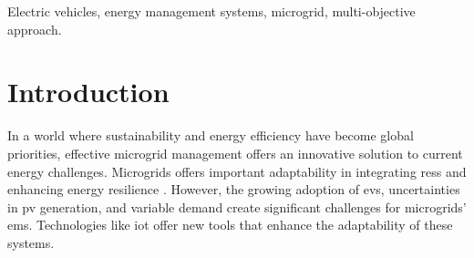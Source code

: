 \documentclass[preprint, 12pt, 3p]{elsarticle}
\begin{document}
\begin{frontmatter}
    \begin{abstract}
        The integration of \glspl{der}, \glspl{bess}, \gls{pv} systems, 
        and \gls{ev} chargers, introduces new challenges for \gls{ems} in
        microgrids.
        One key challenge is developing an optimized day-ahead EMS specifically 
        tailored for three-phase unbalanced AC microgrids, while also 
        accounting for uncertainties in PV generation and demand. 
        Additionally, the EMS must prepare the microgrid for potential 
        transitions between grid-connected and islanded modes due to 
        unexpected grid outages.
        This study addresses a \gls{moop} approach aimed at minimizing 
        operational costs from the main grid and \gls{ens} for \glspl{ev} 
        in microgrids. 
        We also introduce a fairness model for EV charging to ensure 
        equitable distribution among connected vehicles, considering factors 
        such as the \gls{soc} and availability times at \gls{evcs}.
        The proposed \gls{moop} approach is validated through real-time 
        Hardware-in-the-Loop (HIL) simulations, accounting for multiples 
        contingencies and uncertainties.
        To evaluate the proposed EMS, actual data from the \Gls{campus} 
        at the \gls{unicamp} was utilized. 
        The proposed \gls{minlp} model undergoes a
        transformation into a \gls{milp} model through a 
        series of linearizations. Results confirm the robustness and efficacy 
        of the proposed \gls{ems} in improving the performance and resilience 
        of three-phase unbalanced AC microgrids.
    \end{abstract}
    \begin{keyword}
        Electric vehicles, energy management systems, microgrid, 
        multi-objective approach.
    \end{keyword}
\end{frontmatter}


\glsresetall

\section{Introduction}\label{sec:intro}

In a world where sustainability and energy efficiency have become global 
priorities, effective microgrid management offers an innovative solution to current energy challenges. Microgrids offers important 
adaptability in integrating \glspl{res} and enhancing energy 
resilience \cite{uddin2023}. However, the growing adoption of \glspl{ev}, uncertainties in \gls{pv} generation, and variable demand create significant challenges for microgrids' \gls{ems}. Technologies like \gls{iot} offer new tools that enhance the adaptability of these systems.
\end{document}
